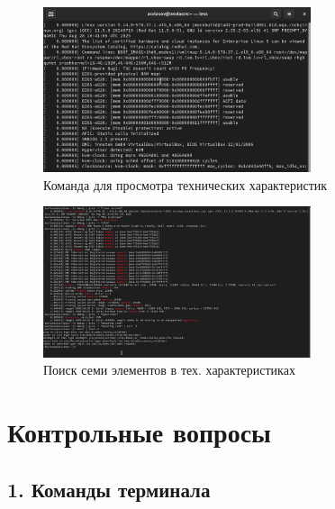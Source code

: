 \documentclass[
  12pt,
  a4paper,
  DIV=11,
  numbers=noendperiod]{scrreprt}
\begin{document}
\begin{figure}

{\centering \includegraphics[width=0.7\textwidth,height=\textheight]{image/16.png}

}

\caption{Команда для просмотра технических характеристик}

\end{figure}%
\begin{figure}

{\centering \includegraphics[width=0.7\textwidth,height=\textheight]{image/17.png}

}

\caption{Поиск семи элементов в тех. характеристиках}

\end{figure}%

\chapter{Контрольные
вопросы}\label{ux43aux43eux43dux442ux440ux43eux43bux44cux43dux44bux435-ux432ux43eux43fux440ux43eux441ux44b}

\section{1. Команды
терминала}\label{ux43aux43eux43cux430ux43dux434ux44b-ux442ux435ux440ux43cux438ux43dux430ux43bux430}
\end{document}

